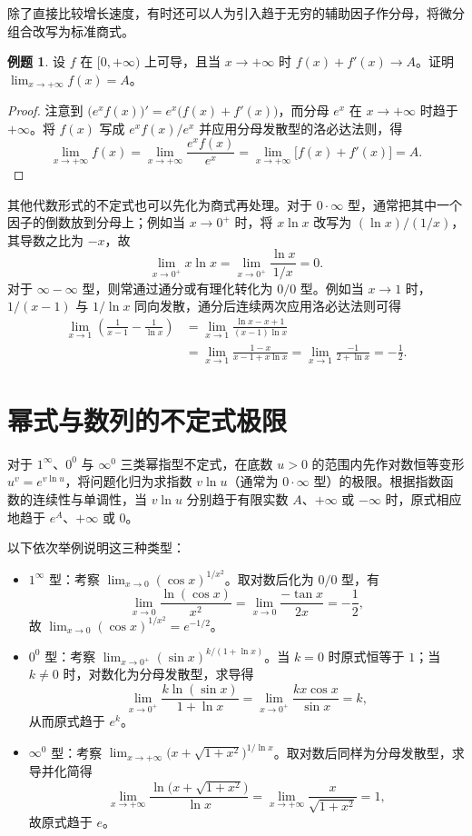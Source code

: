 \documentclass[UTF8,fontset=fandol,a4paper,12pt]{ctexart}
\theoremstyle{definition}
\newtheorem{example}[theorem]{例题}
\begin{document}
除了直接比较增长速度，有时还可以人为引入趋于无穷的辅助因子作分母，将微分组合改写为标准商式。

\begin{example}
设 $f$ 在 $[0,+\infty)$ 上可导，且当 $x\to+\infty$ 时 $f(x)+f'(x)\to A$。证明 $\lim_{x\to+\infty}f(x)=A$。
\end{example}

\begin{proof}
注意到 $\bigl(e^x f(x)\bigr)'=e^x\bigl(f(x)+f'(x)\bigr)$，而分母 $e^x$ 在 $x\to+\infty$ 时趋于 $+\infty$。将 $f(x)$ 写成 $e^x f(x)/e^x$ 并应用分母发散型的洛必达法则，得
\[
 \lim_{x\to+\infty}f(x)=\lim_{x\to+\infty}\frac{e^x f(x)}{e^x}
 =\lim_{x\to+\infty}\bigl[f(x)+f'(x)\bigr]=A.
\]
\end{proof}

其他代数形式的不定式也可以先化为商式再处理。对于 $0\cdot\infty$ 型，通常把其中一个因子的倒数放到分母上；例如当 $x\to0^+$ 时，将 $x\ln x$ 改写为 $(\ln x)/(1/x)$，其导数之比为 $-x$，故
\[
 \lim_{x\to0^+}x\ln x=\lim_{x\to0^+}\frac{\ln x}{1/x}=0.
\]
对于 $\infty-\infty$ 型，则常通过通分或有理化转化为 $0/0$ 型。例如当 $x\to1$ 时，$1/(x-1)$ 与 $1/\ln x$ 同向发散，通分后连续两次应用洛必达法则可得
\begin{align*}
 \lim_{x\to1}\left(\frac1{x-1}-\frac1{\ln x}\right)
 &=\lim_{x\to1}\frac{\ln x-x+1}{(x-1)\ln x}\\
 &=\lim_{x\to1}\frac{1-x}{x-1+x\ln x}
 =\lim_{x\to1}\frac{-1}{2+\ln x}=-\frac12.
\end{align*}

\section{幂式与数列的不定式极限}
对于 $1^\infty$、$0^0$ 与 $\infty^0$ 三类幂指型不定式，在底数 $u>0$ 的范围内先作对数恒等变形 $u^v=e^{v\ln u}$，将问题化归为求指数 $v\ln u$（通常为 $0\cdot\infty$ 型）的极限。根据指数函数的连续性与单调性，当 $v\ln u$ 分别趋于有限实数 $A$、$+\infty$ 或 $-\infty$ 时，原式相应地趋于 $e^A$、$+\infty$ 或 $0$。

以下依次举例说明这三种类型：
\begin{itemize}
\item $1^\infty$ 型：考察 $\lim_{x\to0}(\cos x)^{1/x^2}$。取对数后化为 $0/0$ 型，有
\[
 \lim_{x\to0}\frac{\ln(\cos x)}{x^2}
 =\lim_{x\to0}\frac{-\tan x}{2x}=-\frac12,
\]
故 $\lim_{x\to0}(\cos x)^{1/x^2}=e^{-1/2}$。
\item $0^0$ 型：考察 $\lim_{x\to0^+}(\sin x)^{k/(1+\ln x)}$。当 $k=0$ 时原式恒等于 $1$；当 $k\ne0$ 时，对数化为分母发散型，求导得
\[
 \lim_{x\to0^+}\frac{k\ln(\sin x)}{1+\ln x}
 =\lim_{x\to0^+}\frac{kx\cos x}{\sin x}=k,
\]
从而原式趋于 $e^k$。
\item $\infty^0$ 型：考察 $\lim_{x\to+\infty}\bigl(x+\sqrt{1+x^2}\bigr)^{1/\ln x}$。取对数后同样为分母发散型，求导并化简得
\[
 \lim_{x\to+\infty}\frac{\ln\bigl(x+\sqrt{1+x^2}\bigr)}{\ln x}
 =\lim_{x\to+\infty}\frac{x}{\sqrt{1+x^2}}=1,
\]
故原式趋于 $e$。
\end{itemize}
\end{document}
